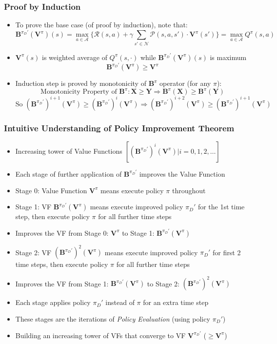 \documentclass[handout]{beamer}
\newcommand{\bvpi}{\bm{V}^{\pi}}
\begin{document}
\begin{frame}
\frametitle{Proof by Induction}
\pause
\begin{itemize}[<+->]
\item To prove the base case (of proof by induction), note that:
$$\bm{B}^{\pi_D'}(\bvpi)(s) = \max_{a \in \mathcal{A}} \{\mathcal{R}(s,a) + \gamma \sum_{s' \in \mathcal{N}} \mathcal{P}(s,a,s') \cdot \bvpi(s')\} = \max_{a \in \mathcal{A}} Q^{\pi}(s,a)$$
\item $\bvpi(s)$ is weighted average of $Q^{\pi}(s,\cdot)$ while $\bm{B}^{\pi_D'}(\bvpi)(s)$ is maximum
$$\bm{B}^{\pi_D'}(\bvpi) \geq \bvpi$$
\item Induction step is proved by monotonicity of $\bm{B}^{\pi}$ operator (for any $\pi$):
$$\text{Monotonicity Property of } \bm{B}^{\pi}: \bm{X} \geq \bm{Y} \Rightarrow \bm{B}^{\pi}(\bm{X}) \geq \bm{B}^{\pi}(\bm{Y})$$
$$\text{So } (\bm{B}^{\pi_D'})^{i+1}(\bvpi) \geq (\bm{B}^{\pi_D'})^i(\bvpi) \Rightarrow (\bm{B}^{\pi_D'})^{i+2}(\bvpi) \geq (\bm{B}^{\pi_D'})^{i+1}(\bvpi)$$
\end{itemize}
\end{frame}


\begin{frame}
\frametitle{Intuitive Understanding of Policy Improvement Theorem}
\pause
\begin{itemize}[<+->]	
\item Increasing tower of Value Functions $[(\bm{B}^{\pi_D'})^i(\bvpi)|i = 0, 1, 2, \ldots]$
\item Each stage of further application of $\bm{B}^{\pi_D'}$ improves the Value Function
\item Stage 0:  Value Function $\bvpi$ means execute policy $\pi$ throughout
\item Stage 1: VF $\bm{B}^{\pi_D'}(\bvpi)$ means execute improved policy $\pi_D'$ for the 1st time step, then execute policy $\pi$ for all further time steps
\item Improves the VF from Stage 0: $\bvpi$ to Stage 1: $\bm{B}^{\pi_D'}(\bvpi)$
\item Stage 2: VF $(\bm{B}^{\pi_D'})^2(\bvpi)$ means execute improved policy $\pi_D'$ for first 2 time steps, then execute policy $\pi$ for all further time steps
\item Improves the VF from Stage 1: $\bm{B}^{\pi_D'}(\bvpi)$ to Stage 2: $(\bm{B}^{\pi_D'})^2(\bvpi)$
\item Each stage applies policy $\pi_D'$ instead of $\pi$ for an extra time step
\item These stages are the iterations of {\em Policy Evaluation} (using policy $\pi_D'$)
\item Building an increasing tower of VFs that converge to VF $\bm{V}^{\pi_D'}$ ($\geq \bvpi$)
\end{itemize}
\end{frame}
\end{document}
